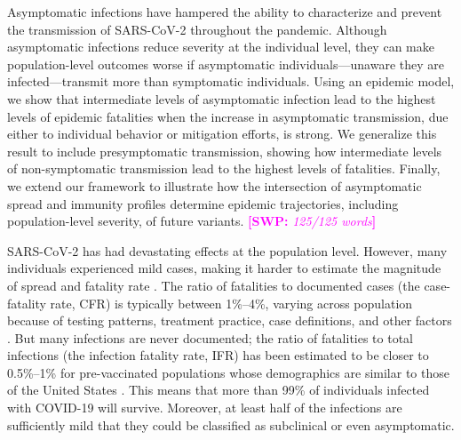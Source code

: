 \documentclass[12pt]{article}
\newcommand{\comment}{\showcomment}
\newcommand{\showcomment}[3]{\textcolor{#1}{\textbf{[#2: }\textsl{#3}\textbf{]}}}
\newcommand{\swp}[1]{\comment{magenta}{SWP}{#1}}
\begin{document}
Asymptomatic infections have hampered the ability to characterize and prevent the transmission of SARS-CoV-2 throughout the pandemic.
Although asymptomatic infections reduce severity at the individual level, they can make population-level outcomes worse if asymptomatic individuals---unaware they are infected---transmit more than symptomatic individuals.
Using an epidemic model, we show that intermediate levels of asymptomatic infection lead to the highest levels of epidemic fatalities when the increase in asymptomatic transmission, due either to individual behavior or mitigation efforts, is strong. 
We generalize this result to include presymptomatic transmission, showing how intermediate levels of non-symptomatic transmission lead to the highest levels of fatalities.
Finally, we extend our framework to illustrate how the intersection of asymptomatic spread and immunity profiles determine epidemic trajectories, including population-level severity, of future variants.  \swp{125/125 words}

\pagebreak

SARS-CoV-2 has had devastating effects at the population level.
However, many individuals experienced mild cases, making it harder to estimate the magnitude of spread and fatality rate \citep{nogrady2020data}.
The ratio of fatalities to documented cases (the case-fatality rate, CFR) is typically between 1\%--4\%, varying across population because of testing patterns, treatment practice, case definitions, and other factors \citep{rajgor2020many,VERITY2020669,yang2020early}.
But many infections are never documented;
the ratio of fatalities to total infections (the infection fatality rate, IFR) has been estimated to be closer to 0.5\%--1\% for pre-vaccinated populations whose demographics are similar to those of the United States \citep{levin2020assessing}. 
This means that more than 99\% of individuals infected with COVID-19 will survive. 
Moreover, at least half of the infections are sufficiently mild that they could be classified as subclinical or even asymptomatic. 
\end{document}
